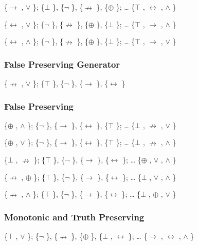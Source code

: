 \{$\to$ , $\lor$ \}; \{$\bot$ \}, \{$\neg$ \}, \{$\nrightarrow$ \}, \{$\oplus$ \}; \ldots{} \{$\top$ , $\leftrightarrow$ , $\land$ \}

\{$\leftrightarrow$ , $\lor$ \}; \{$\neg$ \}, \{$\nrightarrow$ \}, \{$\oplus$ \}, \{$\bot$ \}; \ldots{} \{$\top$ , $\to$ , $\land$ \}

\{$\leftrightarrow$ , $\land$ \}; \{$\neg$ \}, \{$\nrightarrow$ \}, \{$\oplus$ \}, \{$\bot$ \}; \ldots{} \{$\top$ , $\to$ , $\lor$ \}

\hypertarget{false-preserving-generator}{%
\subsubsection{False Preserving
Generator}\label{false-preserving-generator}}

\{$\nrightarrow$ , $\lor$ \}; \{$\top$ \}, \{$\neg$ \}, \{$\to$ \}, \{$\leftrightarrow$ \}

\hypertarget{false-preserving}{%
\subsubsection{False Preserving}\label{false-preserving}}

\{$\oplus$ , $\land$ \}; \{$\neg$ \}, \{$\to$ \}, \{$\leftrightarrow$ \}, \{$\top$ \}; \ldots{} \{$\bot$ , $\nrightarrow$ , $\lor$ \}

\{$\oplus$ , $\lor$ \}; \{$\neg$ \}, \{$\to$ \}, \{$\leftrightarrow$ \}, \{$\top$ \}; \ldots{} \{$\bot$ , $\nrightarrow$ , $\land$ \}

\{$\bot$ , $\nrightarrow$ \}; \{$\top$ \}, \{$\neg$ \}, \{$\to$ \}, \{$\leftrightarrow$ \}; \ldots{} \{$\oplus$ , $\lor$ , $\land$ \}

\{$\nrightarrow$ , $\oplus$ \}; \{$\top$ \}, \{$\neg$ \}, \{$\to$ \}, \{$\leftrightarrow$ \}; \ldots{} \{$\bot$ , $\lor$ , $\land$ \}

\{$\nrightarrow$ , $\land$ \}; \{$\top$ \}, \{$\neg$ \}, \{$\to$ \}, \{$\leftrightarrow$ \}; \ldots{} \{$\bot$ , $\oplus$ , $\lor$ \}

\hypertarget{monotonic-and-truth-preserving}{%
\subsubsection{Monotonic and Truth
Preserving}\label{monotonic-and-truth-preserving}}

\{$\top$ , $\lor$ \}; \{$\neg$ \}, \{$\nrightarrow$ \}, \{$\oplus$ \}, \{$\bot$ , $\leftrightarrow$ \}; \ldots{} \{$\to$ , $\leftrightarrow$ , $\land$ \}

